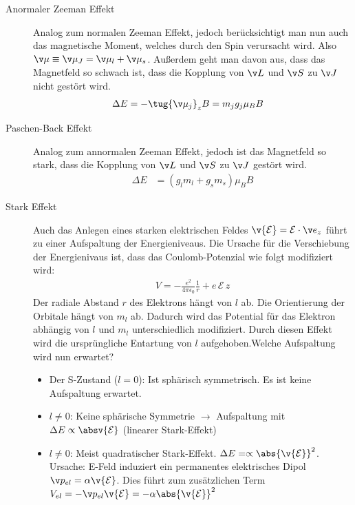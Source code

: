 \documentclass[twocolumn]{summery_4.1}
\begin{document}
\begin{description}
    \item[Anormaler Zeeman Effekt]
    Analog zum normalen Zeeman Effekt, jedoch berücksichtigt man nun auch das magnetische Moment, welches durch den Spin verursacht wird. 
    Also \(\v \mu \equiv \v \mu_J = \v \mu_l + \v \mu_s\). Außerdem geht man davon aus, dass das Magnetfeld so schwach ist, dass die Kopplung von \(\v L\) und \(\v S\) zu \(\v J\) nicht gestört wird. 
    \begin{align*}
        \Delta E &= - \tug{\v \mu_j}_z B = m_j g_j \mu_B B
    \end{align*}

    \item[Paschen-Back Effekt]
    Analog zum annormalen Zeeman Effekt, jedoch ist das Magnetfeld so stark, dass die Kopplung von \(\v L\) und \(\v S\) zu \(\v J\) gestört wird. 
    \begin{align*}
        \Delta E &= (g_l m_l + g_s m_s) \mu_B B 
    \end{align*}

    \item[Stark Effekt]
    Auch das Anlegen eines starken elektrischen Feldes \(\v {\mathcal E} = \mathcal E \cdot \v e_z  \) führt zu einer Aufspaltung der Energieniveaus. Die Ursache für die Verschiebung der Energienivaus ist, dass das Coulomb-Potenzial wie folgt modifiziert wird:
    \begin{align*}
        V=-\frac{e^2}{4\pi\epsilon_0} \frac1r + e\,\mathcal E \,z 
    \end{align*}
    Der radiale Abstand $r$ des Elektrons hängt von $l$ ab. Die Orientierung der Orbitale hängt von $m_l$ ab. Dadurch wird das Potential für das Elektron abhängig von $l$ und $m_l$ unterschiedlich modifiziert. Durch diesen Effekt wird die ursprüngliche Entartung von $l$ aufgehoben.Welche Aufspaltung wird nun erwartet?
    \begin{itemize}
        \item Der S-Zustand (\(l=0\)): Ist sphärisch symmetrisch. Es ist keine Aufspaltung erwartet.
        \item \(l\neq0\): Keine sphärische Symmetrie \(\to\) Aufspaltung mit \(\Delta E \propto \absv{{\mathcal E}}\) (linearer Stark-Effekt)
        \item \(l\neq 0\): Meist quadratischer Stark-Effekt. \(\Delta E =\propto \abs{\v{\mathcal E}}^2\). Ursache: E-Feld induziert ein permanentes elektrisches Dipol \(\v p_{el} = \alpha \v{\mathcal E}\). Dies führt zum zusätzlichen Term \(V_{el} = - \v p_{el} \v{\mathcal E}=-\alpha \abs{\v{\mathcal E}}^2\)
    \end{itemize}


\end{description}
\end{document}
